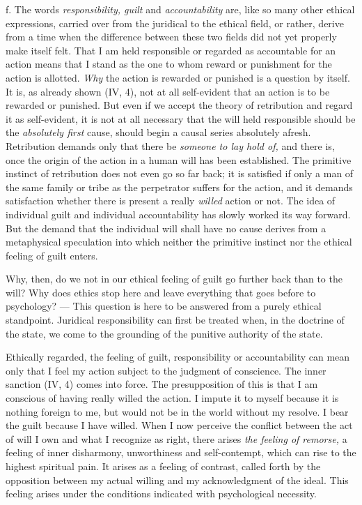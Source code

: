 \documentclass[12pt,a4paper,openany]{book}
\newcommand{\opage}[1]{\marginnote{\footnotesize\textit{[#1]}}}
\begin{document}
f. The words \textit{responsibility, guilt} and \textit{accountability} are, like so many other ethical
expressions, carried over from the juridical to the ethical field, or rather, derive from a time when the
difference between these two fields did not yet properly make itself felt. That I am held responsible or
regarded as accountable for an action means that I stand as the one to whom reward or punishment for the
action is allotted. \textit{Why} the action is rewarded or punished is a question by itself. It is, as
already shown (IV, 4), not at all self-evident that an action is to be rewarded or punished. But even if
we accept the theory of retribution and regard it as self-evident, it is not at all necessary that the
will held responsible should be the \textit{absolutely first} cause, should begin a causal series
absolutely afresh. Retribution demands only that there be \textit{someone to lay hold of,} and there is,
once the origin of the action in a human will has been established. The primitive instinct of retribution
does not even go so far back; it is satisfied if only a man of the same family or tribe as the
perpetrator suffers for the action, and it demands satisfaction whether there is present a really
\textit{willed} action or not. The idea of individual guilt and individual accountability has slowly worked
its way forward. But the demand that the individual will shall have no cause derives from a metaphysical
speculation into which neither the primitive instinct nor the ethical feeling of guilt enters.

Why, then, do we not in our ethical feeling of guilt go further
\opage{118}back than to the will? Why does ethics stop here and leave everything that goes before to psychology?
--- This question is here to be answered from a purely ethical standpoint. Juridical responsibility can
first be treated when, in the doctrine of the state, we come to the grounding of the punitive authority
of the state.

Ethically regarded, the feeling of guilt, responsibility or accountability can mean only that I feel my
action subject to the judgment of conscience. The inner sanction (IV, 4) comes into force. The
presupposition of this is that I am conscious of having really willed the action. I impute it to myself
because it is nothing foreign to me, but would not be in the world without my resolve. I bear the guilt
because I have willed. When I now perceive the conflict between the act of will I own and what I
recognize as right, there arises \textit{the feeling of remorse,} a feeling of inner disharmony,
unworthiness and self-contempt, which can rise to the highest spiritual pain. It arises as a feeling of
contrast, called forth by the opposition between my actual willing and my acknowledgment of the ideal.
This feeling arises under the conditions indicated with psychological necessity.
\end{document}
